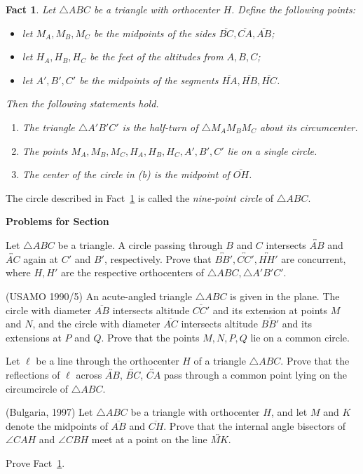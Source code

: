 \documentclass[12pt]{book}
\newcounter{exc}
\numberwithin{exc}{section}
\numberwithin{figure}{section}
\newenvironment{exer}{\vspace{0.1in}
\noindent \textbf{Problems for Section~\thesection} \vspace{0.1in}
\begin{list}{\arabic{exc}.}{\usecounter{exc}}}{\end{list}}
\newtheorem{fact}[theorem]{Fact}
\numberwithin{equation}{theorem}
\def\ii{\item}
\def\line#1{\overleftrightarrow{#1}}
\def\seg#1{\overline{#1}}
\begin{document}
\begin{fact} \label{fact:nine-point}
Let $\triangle ABC$ be a triangle with orthocenter $H$. Define the following 
points:
\begin{itemize}
\item
let $M_A, M_B, M_C$ be the midpoints of the sides 
$\seg{BC}, \seg{CA}, \seg{AB}$;
\item
let $H_A, H_B, H_C$ be the feet of the altitudes from $A,B,C$;
\item
let $A', B', C'$ be the midpoints of the 
segments $\seg{HA}, \seg{HB}, \seg{HC}$.
\end{itemize}
Then the following statements hold.
\begin{enumerate}
\ii[(a)]
The triangle $\triangle A'B'C'$ is the half-turn of 
$\triangle M_AM_BM_C$ about its circumcenter.
\ii[(b)]
The points $M_A, M_B, M_C, H_A, H_B, H_C, A', B', C'$ lie on a single
circle.
\ii[(c)]
The center of the circle in (b) is the
midpoint of $\seg{OH}$.
\end{enumerate}
\end{fact}
The circle described in Fact~\ref{fact:nine-point} is called the
\emph{nine-point circle} 
of $\triangle ABC$.

\begin{exer}

\ii
Let $\triangle ABC$ be a triangle. A circle passing through $B$ and $C$
intersects $\line{AB}$ and $\line{AC}$ again at $C'$ and $B'$,
respectively. Prove that $\line{BB'}, \line{CC'}, \line{HH'}$ are concurrent, 
where $H, H'$ are the respective orthocenters of $\triangle ABC,
\triangle A'B'C'$.

\ii
(USAMO 1990/5)
An acute-angled triangle $\triangle 
ABC$ is given in the plane. The circle with 
diameter $\seg{AB}$ intersects altitude $\seg{CC'}$ and its extension at 
points $M$ and $N$, and the circle with diameter $\seg{AC}$ 
intersects altitude $\seg{BB'}$ and its extensions at $P$ and $Q$. 
Prove that the points $M, N, P, Q$ lie on a common circle.

\ii
Let $\ell$ be a line through the orthocenter %
$H$ of a triangle $\triangle ABC$. Prove that the reflections of $\ell$ across 
$\line{AB}$, $\line{BC}$, $\line{CA}$ pass through a common point lying on
the circumcircle of $\triangle ABC$.

\ii (Bulgaria, 1997)
Let $\triangle ABC$ be a triangle with orthocenter $H$, and let $M$ and $K$
denote the midpoints of $\seg{AB}$ and $\seg{CH}$. Prove that the 
internal angle
bisectors of $\angle CAH$ and $\angle CBH$ meet at a point on
the line $\line{MK}$.

\ii \label{ex:ninept}
Prove Fact~\ref{fact:nine-point}.
\end{exer}
\end{document}
